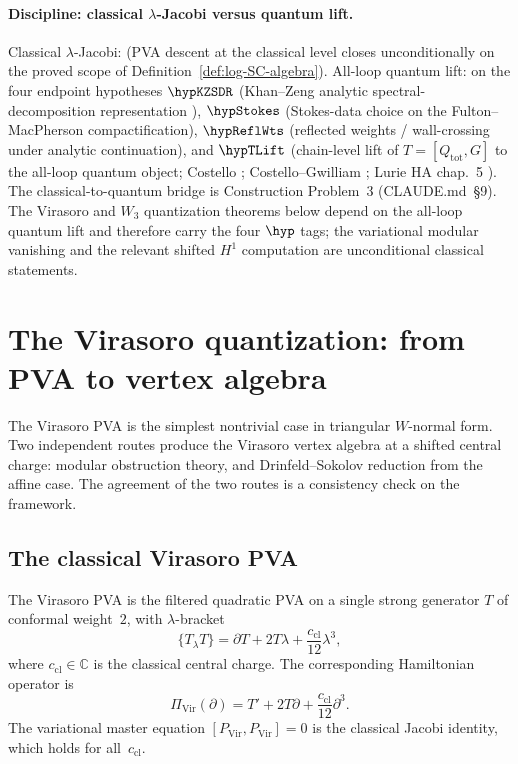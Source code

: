 \label{ch:modular-pva-quantization-frontier}

\paragraph{Discipline: classical $\lambda$-Jacobi versus quantum lift.}
Classical $\lambda$-Jacobi: \ClaimStatusProvedHere{} (PVA descent at
the classical level closes unconditionally on the proved scope of
Definition~\ref{def:log-SC-algebra}). All-loop quantum lift:
\ClaimStatusConditional{} on the four endpoint hypotheses
$\hypKZSDR$ (Khan--Zeng analytic spectral-decomposition representation
\cite{KZ25}), $\hypStokes$ (Stokes-data choice on the Fulton--MacPherson
compactification), $\hypReflWts$ (reflected weights / wall-crossing
under analytic continuation), and $\hypTLift$ (chain-level lift of
$T = [Q_{\mathrm{tot}}, G]$ to the all-loop quantum object;
Costello \cite{Costello2011Renorm}; Costello--Gwilliam \cite{CG17};
Lurie HA chap.~5 \cite{LurieHA}). The classical-to-quantum bridge is
Construction Problem~3 (CLAUDE.md~\S9). The Virasoro and $W_3$
quantization theorems below depend on the all-loop quantum lift and
therefore carry the four $\hyp$ tags; the variational modular
vanishing and the relevant shifted $H^1$ computation are unconditional
classical statements.

\section{The Virasoro quantization: from PVA to vertex algebra}
\label{sec:virasoro-quantization}

The Virasoro PVA is the simplest nontrivial case in triangular
$W$-normal form. Two independent routes produce the Virasoro vertex
algebra at a shifted central charge: modular obstruction theory, and
Drinfeld--Sokolov reduction from the affine case. The agreement of the
two routes is a consistency check on the framework.

\subsection{The classical Virasoro PVA}
\label{subsec:virasoro-classical-pva}

The Virasoro PVA is the filtered quadratic PVA on a single strong generator
$T$ of conformal weight~$2$, with $\lambda$-bracket
\begin{equation}\label{eq:virasoro-pva-bracket}
\{T_\lambda T\} = \partial T + 2T\lambda + \frac{c_{\mathrm{cl}}}{12}\lambda^3,
\end{equation}
where $c_{\mathrm{cl}}\in\mathbb C$ is the classical central charge.
The corresponding Hamiltonian operator is
\[
\Pi_{\mathrm{Vir}}(\partial) = T' + 2T\partial + \frac{c_{\mathrm{cl}}}{12}\partial^3.
\]
The variational master equation $[P_{\mathrm{Vir}},P_{\mathrm{Vir}}]=0$ is
the classical Jacobi identity, which holds for all~$c_{\mathrm{cl}}$.

